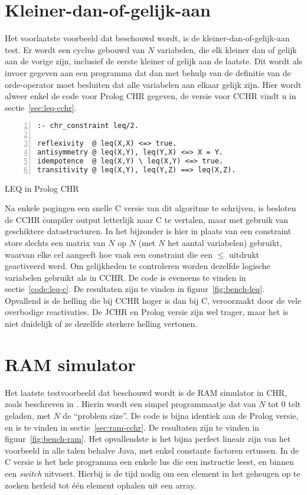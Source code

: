 \section{Kleiner-dan-of-gelijk-aan} \label{sec:bench-leq}

Het voorlaatste voorbeeld dat beschouwd wordt, is de kleiner-dan-of-gelijk-aan test. Er wordt een cyclus gebouwd van $N$ variabelen, die elk kleiner dan of gelijk aan de vorige zijn, inclusief de eerste kleiner of gelijk aan de laatste. Dit wordt als invoer gegeven aan een programma dat dan met behulp van de definitie van de orde-operator moet besluiten dat alle variabelen aan elkaar gelijk zijn. Hier wordt alweer enkel de code voor Prolog CHR gegeven, de versie voor CCHR vindt u in sectie~\ref{sec:leq-cchr}.
\begin{exCode}
\begin{Verbatim}[frame=single,numbers=left]
:- chr_constraint leq/2.

reflexivity  @ leq(X,X) <=> true.
antisymmetry @ leq(X,Y), leq(Y,X) <=> X = Y.
idempotence  @ leq(X,Y) \ leq(X,Y) <=> true.
transitivity @ leq(X,Y), leq(Y,Z) ==> leq(X,Z).
\end{Verbatim}
\caption{\label{code:leq} LEQ in Prolog CHR}
\end{exCode}
Na enkele pogingen een snelle C versie van dit algoritme te schrijven, is besloten de CCHR compiler output letterlijk naar C te vertalen, maar met gebruik van geschiktere datastructuren. In het bijzonder is hier in plaats van een constraint store slechts een matrix van $N$ op $N$ (met $N$ het aantal variabelen) gebruikt, waarvan elke cel aangeeft hoe vaak een constraint die een $\leq$ uitdrukt geactiveerd werd. Om gelijkheden te controleren worden dezelfde logische variabelen gebruikt als in CCHR. De code is eveneens te vinden in sectie~\ref{code:leq-c}.
De resultaten zijn te vinden in figuur~\ref{fig:bench-leq}. Opvallend is de helling die bij CCHR hoger is dan bij C, veroorzaakt door de vele overbodige reactivaties. De JCHR en Prolog versie zijn wel trager, maar het is niet duidelijk of ze dezelfde sterkere helling vertonen.

\section{RAM simulator} \label{sec:bench-ram}

Het laatste testvoorbeeld dat beschouwd wordt is de RAM simulator in CHR, zoals beschreven in \cite{jon:complexity:chr05}.
Hierin wordt een simpel programmaatje dat van $N$ tot $0$ telt geladen, met $N$ de ``problem size''. De code is bijna identiek aan de Prolog versie, en is te vinden in sectie~\ref{sec:ram-cchr}.
De resultaten zijn te vinden in figuur~\ref{fig:bench-ram}. Het opvallendste is het bijna perfect lineair zijn van het voorbeeld in alle talen behalve Java, met enkel constante factoren ertussen. In de C versie is het hele programma een enkele lus die een instructie leest, en binnen een {\em switch} uitvoert. Hierbij is de tijd nodig om een element in het geheugen op te zoeken herleid tot \'e\'en element ophalen uit een array.
